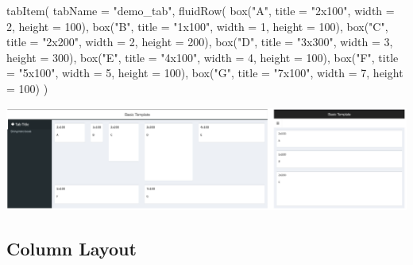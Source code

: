 \documentclass[
]{book}
\newenvironment{Shaded}{\begin{snugshade}}{\end{snugshade}}
\newcommand{\AttributeTok}[1]{\textcolor[rgb]{0.77,0.63,0.00}{#1}}
\newcommand{\DecValTok}[1]{\textcolor[rgb]{0.00,0.00,0.81}{#1}}
\newcommand{\FunctionTok}[1]{\textcolor[rgb]{0.00,0.00,0.00}{#1}}
\newcommand{\NormalTok}[1]{#1}
\newcommand{\StringTok}[1]{\textcolor[rgb]{0.31,0.60,0.02}{#1}}
\begin{document}
\begin{Shaded}
\begin{Highlighting}[]
\FunctionTok{tabItem}\NormalTok{(}
    \AttributeTok{tabName =} \StringTok{"demo\_tab"}\NormalTok{,}
    \FunctionTok{fluidRow}\NormalTok{(}
      \FunctionTok{box}\NormalTok{(}\StringTok{"A"}\NormalTok{, }\AttributeTok{title =} \StringTok{"2x100"}\NormalTok{, }\AttributeTok{width =} \DecValTok{2}\NormalTok{, }\AttributeTok{height =} \DecValTok{100}\NormalTok{),}
      \FunctionTok{box}\NormalTok{(}\StringTok{"B"}\NormalTok{, }\AttributeTok{title =} \StringTok{"1x100"}\NormalTok{, }\AttributeTok{width =} \DecValTok{1}\NormalTok{, }\AttributeTok{height =} \DecValTok{100}\NormalTok{),}
      \FunctionTok{box}\NormalTok{(}\StringTok{"C"}\NormalTok{, }\AttributeTok{title =} \StringTok{"2x200"}\NormalTok{, }\AttributeTok{width =} \DecValTok{2}\NormalTok{, }\AttributeTok{height =} \DecValTok{200}\NormalTok{),}
      \FunctionTok{box}\NormalTok{(}\StringTok{"D"}\NormalTok{, }\AttributeTok{title =} \StringTok{"3x300"}\NormalTok{, }\AttributeTok{width =} \DecValTok{3}\NormalTok{, }\AttributeTok{height =} \DecValTok{300}\NormalTok{),}
      \FunctionTok{box}\NormalTok{(}\StringTok{"E"}\NormalTok{, }\AttributeTok{title =} \StringTok{"4x100"}\NormalTok{, }\AttributeTok{width =} \DecValTok{4}\NormalTok{, }\AttributeTok{height =} \DecValTok{100}\NormalTok{),}
      \FunctionTok{box}\NormalTok{(}\StringTok{"F"}\NormalTok{, }\AttributeTok{title =} \StringTok{"5x100"}\NormalTok{, }\AttributeTok{width =} \DecValTok{5}\NormalTok{, }\AttributeTok{height =} \DecValTok{100}\NormalTok{),}
      \FunctionTok{box}\NormalTok{(}\StringTok{"G"}\NormalTok{, }\AttributeTok{title =} \StringTok{"7x100"}\NormalTok{, }\AttributeTok{width =} \DecValTok{7}\NormalTok{, }\AttributeTok{height =} \DecValTok{100}\NormalTok{)}
\NormalTok{    )}
\end{Highlighting}
\end{Shaded}

\includegraphics{images/sdb_row_layout.png}

\hypertarget{column-layout}{%
\subsection{Column Layout}\label{column-layout}}
\end{document}
